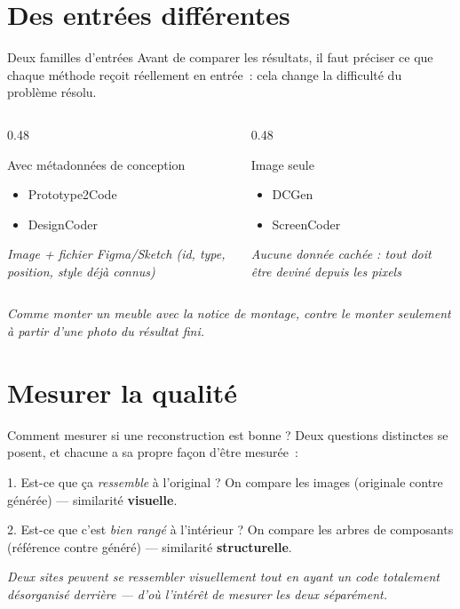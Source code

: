\documentclass[11pt]{beamer}
\begin{document}
\section{Des entrées différentes}

\begin{frame}{Deux familles d'entrées}
Avant de comparer les résultats, il faut préciser ce que chaque méthode reçoit réellement en entrée~: cela change la difficulté du problème résolu.
\vspace{0.3cm}
\begin{columns}
\begin{column}{0.48\textwidth}
\begin{block}{Avec métadonnées de conception}
\small
\begin{itemize}
\item Prototype2Code
\item DesignCoder
\end{itemize}
\textit{Image + fichier Figma/Sketch (id, type, position, style déjà connus)}
\end{block}
\end{column}
\begin{column}{0.48\textwidth}
\begin{block}{Image seule}
\small
\begin{itemize}
\item DCGen
\item ScreenCoder
\end{itemize}
\textit{Aucune donnée cachée : tout doit être deviné depuis les pixels}
\end{block}
\end{column}
\end{columns}
\vspace{0.3cm}
\small\textit{Comme monter un meuble avec la notice de montage, contre le monter seulement à partir d'une photo du résultat fini.}
\end{frame}

\section{Mesurer la qualité}

\begin{frame}{Comment mesurer si une reconstruction est bonne ?}
Deux questions distinctes se posent, et chacune a sa propre façon d'être mesurée~:
\begin{block}{1. Est-ce que ça \textit{ressemble} à l'original ?}
On compare les images (originale contre générée) --- similarité \textbf{visuelle}.
\end{block}
\begin{block}{2. Est-ce que c'est \textit{bien rangé} à l'intérieur ?}
On compare les arbres de composants (référence contre généré) --- similarité \textbf{structurelle}.
\end{block}
\small\textit{Deux sites peuvent se ressembler visuellement tout en ayant un code totalement désorganisé derrière --- d'où l'intérêt de mesurer les deux séparément.}
\end{frame}
\end{document}
